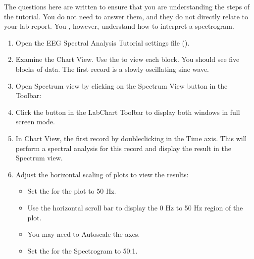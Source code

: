 \documentclass[letterpaper,10pt,english]{jupyterBook}
\begin{document}
\sphinxAtStartPar
{} The questions here are written to ensure that you are understanding the steps of the tutorial. You do not need to answer them, and they do not directly relate to your lab report. You , however, understand how to interpret a spectrogram.
\begin{enumerate}
%
\item {} 
\sphinxAtStartPar
Open the EEG Spectral Analysis Tutorial settings file ().

\item {} 
\sphinxAtStartPar
Examine the Chart View. Use the  to view each block. You should see five blocks of data. The first record is a slowly oscillating sine wave.

\item {} 
\sphinxAtStartPar
Open Spectrum view by clicking on the Spectrum View button in the Toolbar:

\sphinxAtStartPar
{}

\item {} 
\sphinxAtStartPar
Click the  button in the LabChart Toolbar to display both windows in full screen mode.

\item {} 
\sphinxAtStartPar
In Chart View,  the first record by double\sphinxhyphen{}clicking in the Time axis. This will perform a spectral analysis for this record and display the result in the Spectrum view.

\item {} 
\sphinxAtStartPar
Adjust the horizontal scaling of plots to view the results:
\begin{itemize}
\item {} 
\sphinxAtStartPar
Set the  for the  plot to 50 Hz.

\item {} 
\sphinxAtStartPar
Use the horizontal scroll bar to display the 0 Hz to 50 Hz region of the plot.

\item {} 
\sphinxAtStartPar
You may need to Autoscale the axes.

\item {} 
\sphinxAtStartPar
Set the  for the Spectrogram to 50:1.


\end{itemize}
\end{enumerate}
\end{document}
